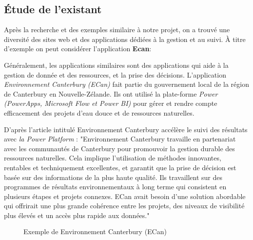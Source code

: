 \documentclass[a4paper]{report}
\begin{document}
\begin{doublespace}
	\subsection{Étude de l’existant}

	Après la recherche et des exemples similaire à notre projet, on a
	trouvé une diversité des sites web et des applications dédiées à la gestion et
	au suivi.
	À titre d'exemple on peut considérer l'application \textbf{\large Ecan}:

	Généralement, les applications similaires sont des applications qui
	aide à la gestion de donnée et des ressources, et la prise des décisions.
	L’application \emph{Environnement Canterbury (ECan)} fait partie du
	gouvernement local de la région de Canterbury en Nouvelle-Zélande. Ils ont
	utilisé la plate-forme \emph{Power
		(PowerApps, Microsoft Flow et Power BI)} pour gérer et rendre compte
	efficacement des projets d'eau douce et de ressources naturelles.

	D’après l'article intitulé Environnement Canterbury accélère le suivi
	des
	résultats avec \emph{la Power Platform} :
	"Environnement Canterbury travaille en partenariat avec les communautés
	de
	Canterbury pour promouvoir la gestion durable des ressources
	naturelles. Cela
	implique l'utilisation de méthodes innovantes, rentables et
	techniquement
	excellentes, et garantit que la prise de décision est basée sur des
	informations
	de la plus haute qualité. Ils travaillent sur des programmes de
	résultats
	environnementaux à long terme qui consistent en plusieurs étapes et
	projets
	connexes. ECan avait besoin d'une solution abordable qui offrirait une
	plus
	grande cohérence entre les projets, des niveaux de visibilité plus
	élevés et un
	accès plus rapide aux données."
	\begin{figure}[H]
		\begin{center}
			\caption{Exemple de Environnement Canterbury (ECan)}
		\end{center}
	\end{figure}
	\newpage

\end{doublespace}
\end{document}
